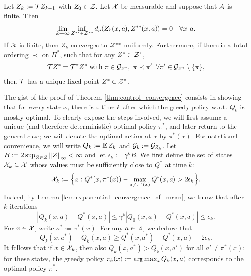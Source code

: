 \documentclass{article}
\def \Vrange {B}
\def \cXk {\cX_k}
\begin{document}
\begin{thm}
Let $Z_k := \mathcal{T} Z_{k-1}$ with $Z_0 \in \mathcal{Z}$. Let $\mathcal{X}$ be measurable and suppose that $\mathcal{A}$ is finite. Then
\begin{equation*}
\lim_{k \to \infty} \inf_{Z^{**} \in \mathcal{Z}^{**}} d_p (Z_k(x,a), Z^{**}(x,a)) = 0 \quad \forall x, a .
\end{equation*}
If $\mathcal{X}$ is finite, then $Z_k$ converges to $\mathcal{Z}^{**}$ uniformly. Furthermore, if there is a total ordering $\prec$ on $\Pi^*$, such that for any $Z^* \in \mathcal{Z}^*$,
\begin{equation*}
\mathcal{T} Z^* = \mathcal{T}^\pi Z^* \; \text{with} \; \pi \in \mathcal{G}_{Z^*}, \; \pi \prec \pi' \; \; \forall \pi' \in \mathcal{G}_{Z^*} \setminus \{\pi \},
\end{equation*}
then $\mathcal{T}$ has a unique fixed point $Z^* \in \mathcal{Z}^*$.%
\end{thm}

The gist of the proof of Theorem \ref{thm:control_convergence} consists in showing that for every state $x$, there is a time $k$ after which the greedy policy w.r.t. $Q_k$ is mostly optimal. 
To clearly expose the steps involved, we will first assume a unique (and therefore deterministic) optimal policy $\pi^*$, and later return to the general case; we will denote the optimal action at $x$ by $\pi^*(x)$.
For notational convenience, we will write $Q_k := \expect Z_k$ and $\mathcal{G}_k := \mathcal{G}_{Z_k}$.
%
Let $\Vrange := 2 \sup_{Z \in \cZ} \infnorm{Z} < \infty$ and let $\epsilon_k := \gamma^k \Vrange$. 
We first define the set of states $\cXk \subseteq \cX$ whose values must be sufficiently close to $Q^*$ at time $k$:
\begin{equation}
\cXk := \Big \{ x : Q^*(x, \pi^*(x)) - \max_{a \ne \pi^*(x)} Q^*(x,a) > 2 \epsilon_k \Big \} .\label{eqn:defn_cxk}
\end{equation}
Indeed, by Lemma \ref{lem:exponential_convergence_of_mean}, we know that after $k$ iterations
\begin{equation*}
| Q_k(x,a) - Q^*(x,a) | \le \gamma^k | Q_0(x,a) - Q^*(x,a) | \le \epsilon_k .
\end{equation*}
For $x \in \mathcal{X}$, write $a^* := \pi^*(x)$. For any $a \in \mathcal{A}$, we deduce that
\begin{equation*}
Q_k(x,a^*) - Q_k(x, a) \ge Q^*(x, a^*) - Q^*(x, a) - 2 \epsilon_k .
\end{equation*}
It follows that if $x \in \mathcal{X}_k$, then also $Q_k(x, a^*) > Q_k(x, a')$ for all $a' \ne \pi^*(x)$: for these states, the greedy policy $\pi_k(x) := \operatorname*{arg\,max}_a Q_k(x, a)$ corresponds to the optimal policy $\pi^*$.
\end{document}
